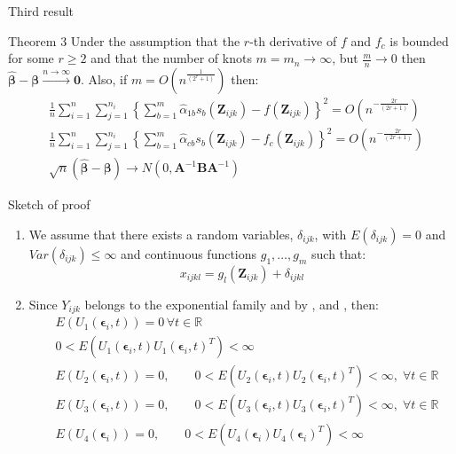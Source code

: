 \documentclass[t,9pt]{beamer}
\begin{document}
\begin{frame}[fragile]{Third result}
 \begin{block}{Theorem 3}
Under the assumption that the $r$-th  derivative of $f$ and $f_c$ is bounded for some $r\geq 2$ and that the number of knots $m=m_n\rightarrow \infty$, but $\frac{m}{n}\rightarrow 0$ then $\hat{\pmb{\beta}}-\pmb{\beta} \xrightarrow{n\rightarrow\infty}\pmb{0}$. Also, if $m=O\left( n^{\frac{1}{(2^r+1)}}\right)$ then:
\begin{align}
   & \frac{1}{n}\sum_{i=1}^n \sum_{j=1}^{n_i} \left\{\sum_{b=1}^m \hat{\alpha}_{1b}s_b(\pmb{Z}_{ijk})- f(\pmb{Z}_{ijk})\right\}^2 = O\left(n^{-\frac{2r}{(2r+1)}}\right) \nonumber\\
   & \frac{1}{n}\sum_{i=1}^n \sum_{j=1}^{n_i} \left\{\sum_{b=1}^m \hat{\alpha}_{cb}s_b(\pmb{Z}_{ijk})- f_c(\pmb{Z}_{ijk})\right\}^2 = O\left(n^{-\frac{2r}{(2r+1)}}\right)\nonumber\\
  &  \sqrt{n}(\hat{\pmb{\beta}}-\pmb{\beta}) \rightarrow N(0, \pmb{A}^{-1}\pmb{B}\pmb{A}^{-1})\nonumber
\end{align}
 \end{block} 
\end{frame}

\begin{frame}[fragile]{Sketch of proof}
\begin{enumerate}
    \item We assume that there exists a random variables, $\delta_{ijk}$, with $E(\delta_{ijk})=0$ and $Var(\delta_{ijk})\leq\infty$ and continuous functions $g_1, \ldots, g_m$  such that:
\begin{equation}
    x_{ijkl}=g_l(\pmb{Z}_{ijk})+ \delta_{ijkl} \nonumber
\end{equation}
\item Since $Y_{ijk}$ belongs to  the exponential family and by \cite{liang1986longitudinal}, and \cite{lehmann2006theory}, then:
\begin{align}
         &E(U_1(\pmb{\epsilon}_i, t))=0 \, \forall t\in \mathbb{R}\nonumber\\
         &0 < E\left(U_1(\pmb{\epsilon}_i, t) U_1(\pmb{\epsilon}_i, t)^T\right) < \infty \nonumber\\
         &E(U_2(\pmb{\epsilon}_i, t))=0, \qquad 0< E\left(U_2(\pmb{\epsilon}_i, t)U_2(\pmb{\epsilon}_i, t)^T\right) <\infty, \; \forall t\in \mathbb{R}\nonumber\\
        &E(U_3(\pmb{\epsilon}_i, t))=0, \qquad 0< E\left(U_3(\pmb{\epsilon}_i, t)U_3(\pmb{\epsilon}_i, t)^T\right) <\infty, \; \forall t\in \mathbb{R}\nonumber\\
        &E(U_4(\pmb{\epsilon}_i))=0, \qquad 0< E\left(U_4(\pmb{\epsilon}_i)U_4(\pmb{\epsilon}_i)^T\right) <\infty \nonumber
\end{align}
\end{enumerate}
\end{frame}
\end{document}
